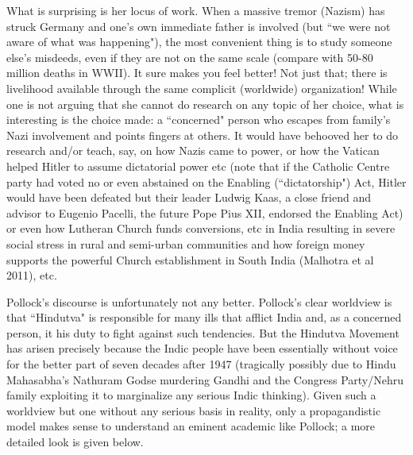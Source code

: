 What is surprising is her locus of work. When a massive tremor (Nazism) has struck Germany and one's own immediate father is involved (but ``we were not aware of what was happening"), the most convenient thing is to study someone else's misdeeds, even if they are not on the same scale (compare with 50-80 million deaths in WWII). It sure makes you feel better! Not just that; there is livelihood available through the same complicit (worldwide) organization! While one is not arguing that she cannot do research on any topic of her choice, what is interesting is the choice made: a ``concerned" person who escapes from family’s Nazi involvement and points fingers at others. It would have behooved her to do research and/or teach, say, on how Nazis came to power, or how the Vatican helped Hitler to assume dictatorial power etc (note that if the Catholic Centre party had voted no or even abstained on the Enabling (``dictatorship") Act, Hitler would have been defeated but their leader Ludwig Kaas, a close friend and advisor to Eugenio Pacelli, the future Pope Pius XII, endorsed the Enabling Act) or even how Lutheran Church funds conversions, etc in India resulting in severe social stress in rural and semi-urban communities and how foreign money supports the powerful Church establishment in South India (Malhotra et al 2011), etc. 

Pollock's discourse is unfortunately not any better. Pollock's clear worldview is that ``Hindutva" is responsible for many ills that afflict India and, as a concerned person, it his duty to fight against such tendencies. But the Hindutva Movement has arisen precisely because the Indic people have been essentially without voice for the better part of seven decades after 1947 (tragically possibly due to Hindu Mahasabha’s Nathuram Godse murdering Gandhi and the Congress Party/Nehru family exploiting it to marginalize any serious Indic thinking).  Given such a worldview but one without any serious basis in reality, only a propagandistic model makes sense to understand an eminent academic like Pollock; a more detailed look is given below.
\eject

